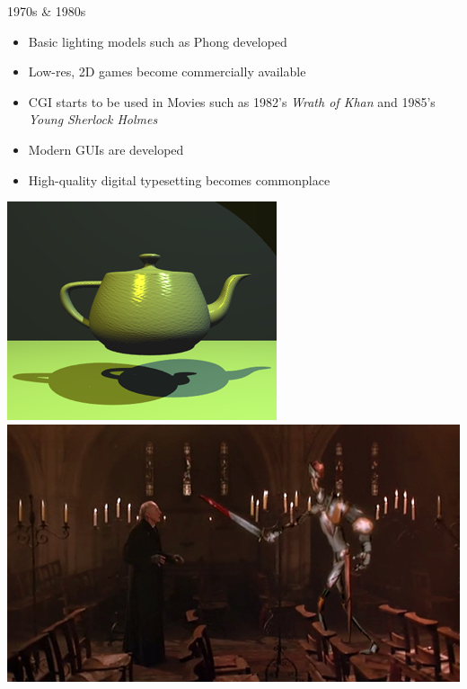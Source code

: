 \documentclass{lug}
\begin{document}
\begin{frame}{1970s \& 1980s}
    \noindent
    \begin{minipage}{.65\textwidth - 2em}
        \small
        \begin{itemize}
            \item Basic lighting models such as Phong developed
            \item Low-res, 2D games become commercially available
            \item CGI starts to be used in Movies such as 1982's \textit{Wrath of Khan} and 1985's \textit{Young Sherlock Holmes}
            \item Modern GUIs are developed
            \item High-quality digital typesetting becomes commonplace
        \end{itemize}
    \end{minipage}%
    \hspace{1.5em}%
    \begin{minipage}{.35\textwidth}
        \includegraphics[width=\textwidth]{graphics/teapot_70s} \\
        \includegraphics[width=\textwidth]{graphics/ysh_knight} \\

\end{minipage}
\end{frame}
\end{document}
